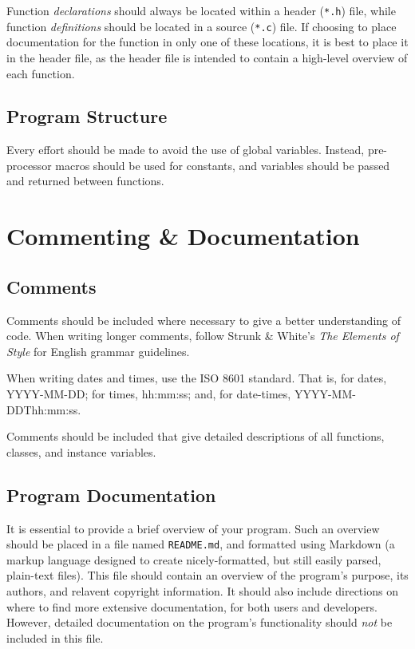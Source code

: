 \documentclass[11pt]{book}
\begin{document}
Function \emph{declarations} should always be located within a header
(\texttt{*.h}) file, while function \emph{definitions} should be located
in a source (\texttt{*.c}) file. If choosing to place documentation for
the function in only one of these locations, it is best to place it in
the header file, as the header file is intended to contain a high-level
overview of each function.

\section{Program Structure}\label{program-structure}

Every effort should be made to avoid the use of global variables.
Instead, pre-processor macros should be used for constants, and
variables should be passed and returned between functions.

\chapter{Commenting \& Documentation}\label{commenting-documentation}

\section{Comments}\label{comments}

Comments should be included where necessary to give a better
understanding of code. When writing longer comments, follow Strunk \&
White's \emph{The Elements of Style} for English grammar guidelines.

When writing dates and times, use the ISO 8601 standard. That is, for
dates, YYYY-MM-DD; for times, hh:mm:ss; and, for date-times,
YYYY-MM-DDThh:mm:ss.

Comments should be included that give detailed descriptions of all
functions, classes, and instance variables.

\section{Program Documentation}\label{program-documentation}

It is essential to provide a brief overview of your program. Such an
overview should be placed in a file named \texttt{README.md}, and
formatted using Markdown (a markup language designed to create
nicely-formatted, but still easily parsed, plain-text files). This file
should contain an overview of the program's purpose, its authors, and
relavent copyright information. It should also include directions on
where to find more extensive documentation, for both users and
developers. However, detailed documentation on the program's
functionality should \emph{not} be included in this file.
\end{document}
